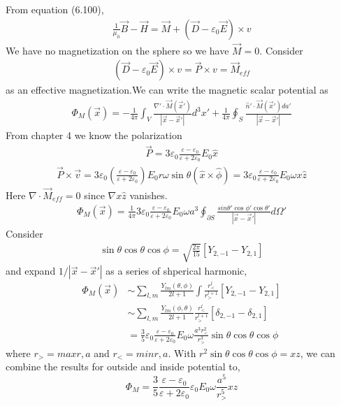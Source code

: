 \documentclass{article}
\begin{document}
From equation (6.100),
\begin{align*}
  \frac{1}{\mu_0}\vec B-\vec H=\vec M+(\vec D-\varepsilon_0\vec E)\times v
\end{align*}
We have no magnetization on the sphere so we have $\vec M=0$. Consider
\begin{align*}
  (\vec D-\varepsilon_0\vec E)\times v=\vec P\times v=\vec M_{eff}
\end{align*}
as an effective magnetization.We can write the magnetic scalar potential as
\begin{align*}
  \Phi_M(\vec x)=-\frac{1}{4\pi}\int_V\frac{\nabla'\cdot\vec M(\vec x')}{|\vec x-\vec x'|}d^3x'+\frac{1}{4\pi}\oint_S\frac{\hat n'\cdot\vec M(\vec x')da'}{|\vec x-\vec x'|}
\end{align*}
From chapter 4 we know the polarization
\begin{align*}
  \vec P=3\varepsilon_0\frac{\varepsilon-\varepsilon_0}{\varepsilon+2\varepsilon_0}E_0\hat x
\end{align*}
\begin{align*}
  \vec P\times\vec v=3\varepsilon_0(\frac{\varepsilon-\varepsilon_0}{\varepsilon+2\varepsilon_0})E_0r\omega\sin\theta(\hat x\times\hat\phi)=3\varepsilon_0\frac{\varepsilon-\varepsilon_0}{\varepsilon+2\varepsilon_0}E_0\omega x\hat z 
\end{align*}
Here $\nabla\cdot\vec M_{eff}=0$ since $\nabla x\hat z$ vanishes.
\begin{align*}
  \Phi_M(\vec x)=\frac{1}{4\pi}3\varepsilon_0\frac{\varepsilon-\varepsilon_0}{\varepsilon+2\varepsilon_0}E_0\omega a^3\oint_{\partial S}\frac{sin\theta'\cos\phi'\cos\theta'}{|\vec x-\vec x'|}d\Omega'
\end{align*}
Consider
\begin{align*}
  \sin\theta\cos\theta\cos\phi=\sqrt{\frac{2\pi}{15}}[Y_{2,-1}-Y_{2,1}]
\end{align*}
and expand $1/|\vec x-\vec x'|$ as a series of shperical harmonic,
\begin{align*}
  \Phi_M(\vec x)&\sim\sum_{l,m}\frac{Y_{lm}(\theta,\phi)}{2l+1}\int \frac{r_<^l}{r_>^{l+1}}[Y_{2,-1}-Y_{2,1}]\\
                &\sim\sum_{l,m}\frac{Y_{lm}(\phi,\theta)}{2l+1}\frac{r_<^l}{r_>^{l+1}}[\delta_{2,-1}-\delta_{2,1}]\\
  &=\frac{3}{5}\varepsilon_0\frac{\varepsilon-\varepsilon_0}{\varepsilon+2\varepsilon_0}E_0\omega\frac{a^3r_<^2}{r_>^{3}}\sin\theta\cos\theta\cos\phi
\end{align*}
where $r_>=max{r,a}$ and $r_<=min{r,a}$. With $r^2\sin\theta\cos\theta\cos\phi=xz$, we can combine the results for outside and inside potential to,
\[ \boxed{\Phi_M=\frac{3}{5}\frac{\varepsilon-\varepsilon_0}{\varepsilon+2\varepsilon_0}\varepsilon_0E_0\omega\frac{a^5}{r_>^5}xz}\]
\pagebreak
\end{document}

